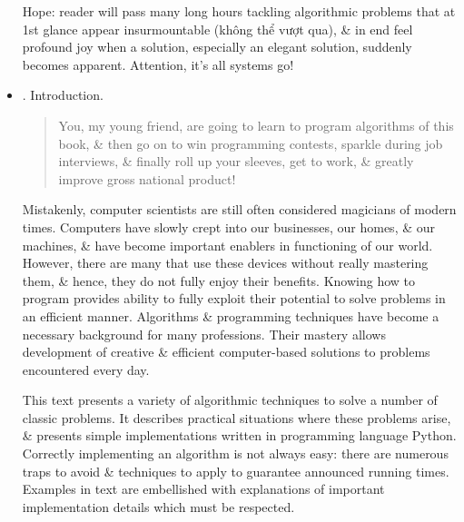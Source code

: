 \documentclass{article}
\begin{document}
\begin{itemize}
	Hope: reader will pass many long hours tackling algorithmic problems that at 1st glance appear insurmountable (không thể vượt qua), \& in end feel profound joy when a solution, especially an elegant solution, suddenly becomes apparent. Attention, it's all systems go!
	\item {. Introduction.}
	\begin{quote}
		You, my young friend, are going to learn to program algorithms of this book, \& then go on to win programming contests, sparkle during job interviews, \& finally roll up your sleeves, get to work, \& greatly improve gross national product!
	\end{quote}
	Mistakenly, computer scientists are still often considered magicians of modern times. Computers have slowly crept into our businesses, our homes, \& our machines, \& have become important enablers in functioning of our world. However, there are many that use these devices without really mastering them, \& hence, they do not fully enjoy their benefits. Knowing how to program provides ability to fully exploit their potential to solve problems in an efficient manner. Algorithms \& programming techniques have become a necessary background for many professions. Their mastery allows development of creative \& efficient computer-based solutions to problems encountered every day.
	
	This text presents a variety of algorithmic techniques to solve a number of classic problems. It describes practical situations where these problems arise, \& presents simple implementations written in programming language Python. Correctly implementing an algorithm is not always easy: there are numerous traps to avoid \& techniques to apply to guarantee announced running times. Examples in text are embellished with explanations of important implementation details which must be respected.
	

\end{itemize}
\end{document}
